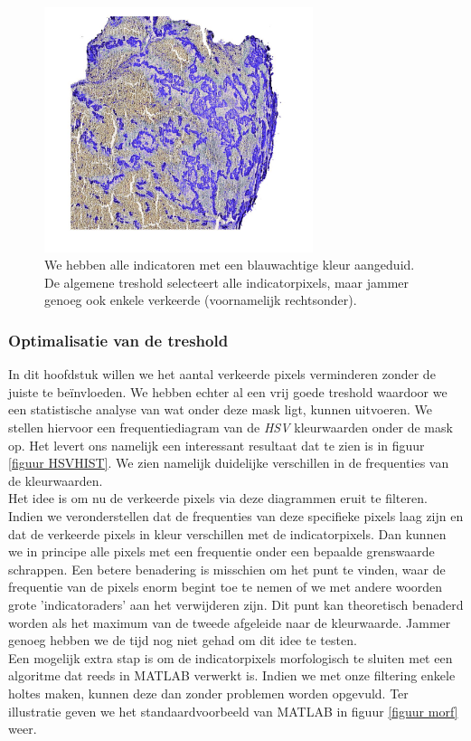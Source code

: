 \documentclass[a4paper,kulak]{kulakarticle}
\begin{document}
	\begin{figure}[H]
	\centering
	\includegraphics[width = 0.7\textwidth]{algemene_treshold}
	
	\caption{We hebben alle indicatoren met een blauwachtige kleur aangeduid. De algemene treshold selecteert alle indicatorpixels, maar jammer genoeg ook enkele verkeerde (voornamelijk rechtsonder).}
	\label{figuur alg_tresh}
	\end{figure}

	\subsubsection{Optimalisatie van de treshold}
		In dit hoofdstuk willen we het aantal verkeerde pixels verminderen zonder de juiste te beïnvloeden. We hebben echter al een vrij goede treshold waardoor we een statistische analyse van wat onder deze mask ligt, kunnen uitvoeren. We stellen hiervoor een frequentiediagram van de \textit{HSV} kleurwaarden onder de mask op. Het levert ons namelijk een interessant resultaat dat te zien is in figuur  \ref{figuur HSVHIST}. We zien namelijk duidelijke verschillen in de frequenties van de kleurwaarden. \\
		Het idee is om nu de verkeerde pixels via deze diagrammen eruit te filteren. Indien we veronderstellen dat de frequenties van deze specifieke pixels laag zijn en dat de verkeerde pixels in kleur verschillen met de indicatorpixels. Dan kunnen we in principe alle pixels met een frequentie onder een bepaalde grenswaarde schrappen. Een betere benadering is misschien om het punt te vinden, waar de frequentie van de pixels enorm begint toe te nemen of we met andere woorden grote 'indicatoraders' aan het verwijderen zijn. Dit punt kan theoretisch benaderd worden als het maximum van de tweede afgeleide naar de kleurwaarde. Jammer genoeg hebben we de tijd nog niet gehad om dit idee te testen. \\
		Een mogelijk extra stap is om de indicatorpixels morfologisch te sluiten met een algoritme dat reeds in MATLAB verwerkt is. Indien we met onze filtering enkele holtes maken, kunnen deze dan zonder problemen worden opgevuld. Ter illustratie geven we het standaardvoorbeeld van MATLAB in figuur \ref{figuur morf} weer.
\end{document}
